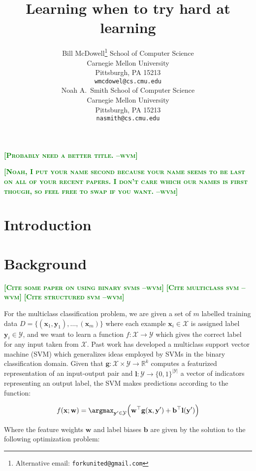 \documentclass{article} %
\title{Learning when to try hard at learning}
\author{
Bill McDowell\thanks{Alternative email: \texttt{forkunited@gmail.com}}
School of Computer Science\\
Carnegie Mellon University\\
Pittsburgh, PA 15213 \\
\texttt{wmcdowel@cs.cmu.edu} \\
\And
Noah A.~Smith
School of Computer Science\\
Carnegie Mellon University\\
Pittsburgh, PA 15213 \\
\texttt{nasmith@cs.cmu.edu} \\
}
\newcommand{\bmcomment}[1]{\textcolor{green}{\textsc{\textbf{[#1 --wvm]}}}}
\begin{document}
\maketitle

\bmcomment{Probably need a better title.}

\bmcomment{Noah, I put your name second because your name seems 
to be last on all of your recent papers.  I don't care which our names is
first though, so feel free to swap if you want.}

\begin{abstract}
\end{abstract}

\section{Introduction}

\section{Background}

\bmcomment{Cite some paper on using binary svms}
\bmcomment{Cite multiclass svm}
\bmcomment{Cite structured svm}

For the multiclass classification problem, we are given a set of
$m$ labelled training data
$D=\{(\mathbf{x}_1,\mathbf{y}_1),\hdots,(\mathbf{x}_m)\}$ where each
example $\mathbf{x}_i\in \mathcal{X}$ is assigned label 
$\mathbf{y}_i\in\mathcal{Y}$, and we want to learn a function 
$f:\mathcal{X}\rightarrow\mathcal{Y}$ which gives the correct
label for any input taken from $\mathcal{X}$.  Past work has developed
a multiclass support vector machine (SVM) which generalizes ideas
employed by SVMs in the binary classification domain.  Given that
$\mathbf{g}:\mathcal{X}\times\mathcal{Y}\rightarrow \mathbb{R}^k$ 
computes a featurized representation of an input-output pair and
$\mathbf{l}:\mathcal{Y}\rightarrow\{0,1\}^{|\mathcal{Y}|}$ a 
vector of indicators representing an output label, the SVM makes 
predictions according to the function:

\begin{equation}
\label{prediction}
f(\mathbf{\mathbf{x};\mathbf{w}})=\argmax_{\mathbf{y}'\in\mathcal{Y}}\Big( \mathbf{w}^\top \mathbf{g}(\mathbf{x},\mathbf{y}')+\mathbf{b}^\top\mathbf{l}(\mathbf{y}') \Big)
\end{equation}

Where the feature weights $\mathbf{w}$ and label biases $\mathbf{b}$
are given by the solution to the following optimization problem:
\end{document}
